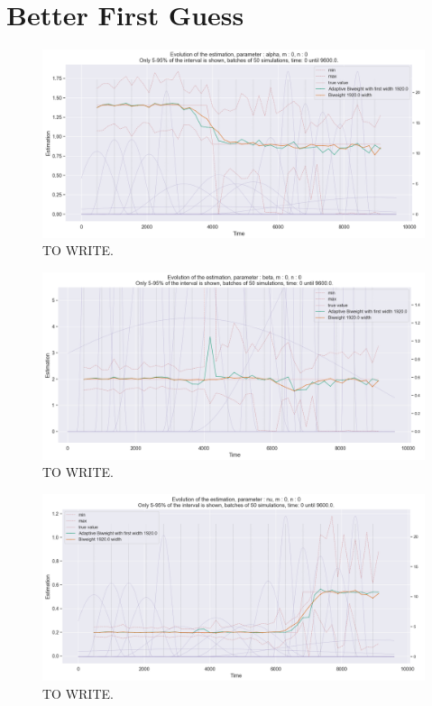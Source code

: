 \newpage
\section{Better First Guess}



\begin{figure}
\centering
\includegraphics[width = 0.90 \textwidth]{../imag/chap3/2_bis/P.png}
\caption{TO WRITE.}
\label{fig:second_estimate_2_alpha}
\end{figure}

\begin{figure}
\centering
\includegraphics[width = 0.90 \textwidth]{../imag/chap3/2_bis/Q.png}
\caption{TO WRITE.}
\label{fig:second_estimate_2_beta}
\end{figure}

\begin{figure}
\centering
\includegraphics[width = 0.90 \textwidth]{../imag/chap3/2_bis/R.png}
\caption{TO WRITE.}
\label{fig:second_estimate_2_nu}
\end{figure}






